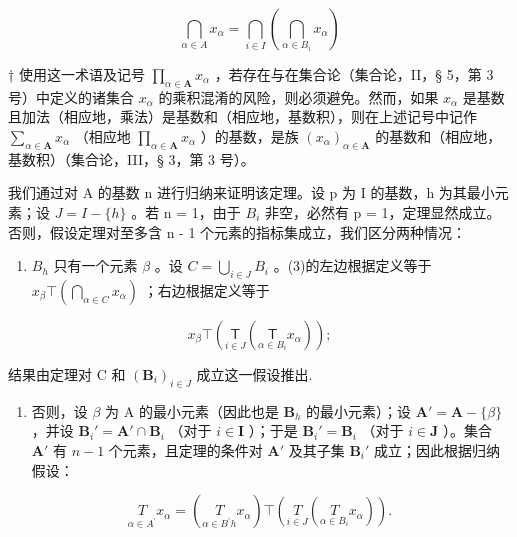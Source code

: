 \[
\bigcap_ {\alpha \in A} x _ {\alpha} = \bigcap_ {i \in I} \left(\bigcap_ {\alpha \in B _ {i}} x _ {\alpha}\right)\tag{3}
\]

† 使用这一术语及记号 \(\prod_{\alpha \in \mathbf{A}} x_{\alpha}\) ，若存在与在集合论（集合论，II，§ 5，第 3 号）中定义的诸集合 \(x_{\alpha}\) 的乘积混淆的风险，则必须避免。然而，如果 \(x_{\alpha}\) 是基数且加法（相应地，乘法）是基数和（相应地，基数积），则在上述记号中记作 \(\sum_{\alpha \in \mathbf{A}} x_{\alpha}\) （相应地 \(\prod_{\alpha \in \mathbf{A}} x_{\alpha}\) ）的基数，是族 \((x_{\alpha})_{\alpha \in \mathbf{A}}\) 的基数和（相应地，基数积）（集合论，III，§ 3，第 3 号）。

我们通过对 A 的基数 n 进行归纳来证明该定理。设 p 为 I 的基数，h 为其最小元素；设 \(J = I - \{h\}\) 。若 n = 1，由于 \(B_{i}\) 非空，必然有 p = 1，定理显然成立。否则，假设定理对至多含 n - 1 个元素的指标集成立，我们区分两种情况：

\begin{enumerate}
\def\labelenumi{(\alph{enumi})}
\tightlist
\item
  \(B_{h}\) 只有一个元素 \(\beta\) 。设 \(C = \bigcup_{i \in J} B_{i}\) 。(3)的左边根据定义等于 \(x_{\beta} \top \left( \bigcap_{\alpha \in C} x_{\alpha} \right)\) ；右边根据定义等于
\end{enumerate}

\[
x _ {\beta} \top \left(\underset {i \in J} {\mathsf {T}} \left(\underset {\alpha \in B _ {i}} {\mathsf {T}} x _ {\alpha}\right)\right);
\]

结果由定理对 C 和 \((\mathbf{B}_{i})_{i\in J}\) 成立这一假设推出.

\begin{enumerate}
\def\labelenumi{(\alph{enumi})}
\setcounter{enumi}{1}
\tightlist
\item
  否则，设 \(\beta\) 为 A 的最小元素（因此也是 \(\mathbf{B}_h\) 的最小元素）；设 \(\mathbf{A}' = \mathbf{A} - \{\beta\}\) ，并设 \(\mathbf{B}_i' = \mathbf{A}' \cap \mathbf{B}_i\) （对于 \(i \in \mathbf{I}\) ）；于是 \(\mathbf{B}_i' = \mathbf{B}_i\) （对于 \(i \in \mathbf{J}\) ）。集合 \(\mathbf{A}'\) 有 \(n - 1\) 个元素，且定理的条件对 \(\mathbf{A}'\) 及其子集 \(\mathbf{B}_i'\) 成立；因此根据归纳假设：
\end{enumerate}

\[
\underset {\alpha \in A ^ {\prime}} {T} x _ {\alpha} = \left(\underset {\alpha \in B ^ {\prime} h} {T} x _ {\alpha}\right) \top \left(\underset {i \in J} {T} \left(\underset {\alpha \in B _ {i}} {T} x _ {\alpha}\right)\right).
\]


